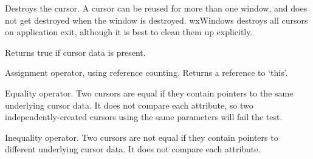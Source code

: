 


Destroys the cursor. A cursor can be reused for more
than one window, and does not get destroyed when the window is
destroyed. wxWindows destroys all cursors on application exit, although
it is best to clean them up explicitly.

\label{wxcursorok}


Returns true if cursor data is present.

\label{wxcursorassignment}


Assignment operator, using reference counting. Returns a reference
to `this'.

\label{wxcursorequals}


Equality operator. Two cursors are equal if they contain pointers
to the same underlying cursor data. It does not compare each attribute,
so two independently-created cursors using the same parameters will
fail the test.

\label{wxcursornotequals}


Inequality operator. Two cursors are not equal if they contain pointers
to different underlying cursor data. It does not compare each attribute.


